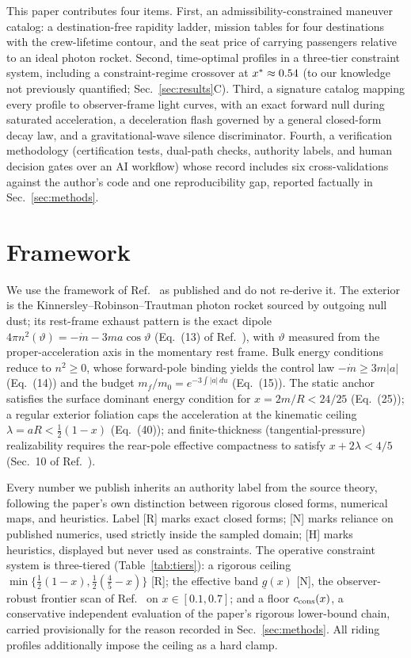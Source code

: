 \documentclass[11pt]{article}
\begin{document}
This paper contributes four items. First, an admissibility-constrained
maneuver catalog: a destination-free rapidity ladder, mission tables for
four destinations with the crew-lifetime contour, and the seat price of
carrying passengers relative to an ideal photon rocket. Second,
time-optimal profiles in a three-tier constraint system, including a
constraint-regime crossover at $x^* \approx 0.54$ (to our knowledge
not previously quantified; Sec.~\ref{sec:results}C). Third, a signature
catalog mapping every
profile to observer-frame light curves, with an exact forward null during
saturated acceleration, a deceleration flash governed by a general
closed-form decay law, and a gravitational-wave silence discriminator.
Fourth, a verification methodology (certification tests, dual-path checks,
authority labels, and human decision gates over an AI workflow) whose
record includes six cross-validations against the author's code and one
reproducibility gap, reported factually in Sec.~\ref{sec:methods}.

\section{Framework}\label{sec:framework}

We use the framework of Ref.~\cite{le-steering} as published and do not
re-derive it. The exterior is the Kinnersley--Robinson--Trautman photon
rocket sourced by outgoing null dust; its rest-frame exhaust pattern is
the exact dipole $4\pi n^2(\vartheta) = -\dot m - 3ma\cos\vartheta$
(Eq.~(13) of Ref.~\cite{le-steering}), with $\vartheta$ measured from the
proper-acceleration axis in the momentary rest frame. Bulk energy
conditions reduce to $n^2 \geq 0$, whose forward-pole binding yields the
control law $-\dot m \geq 3m|a|$ (Eq.~(14)) and the budget $m_f/m_0 =
e^{-3\int|a|\,du}$ (Eq.~(15)). The static anchor satisfies the surface
dominant energy condition for $x = 2m/R < 24/25$ (Eq.~(25)); a regular
exterior foliation caps the acceleration at the kinematic ceiling
$\lambda = aR < \tfrac{1}{2}(1-x)$ (Eq.~(40)); and finite-thickness
(tangential-pressure) realizability requires the rear-pole effective
compactness to satisfy $x + 2\lambda < 4/5$ (Sec.~10 of
Ref.~\cite{le-steering}).

Every number we publish inherits an authority label from the source
theory, following the paper's own distinction between rigorous closed
forms, numerical maps, and heuristics. Label [R] marks exact closed forms;
[N] marks reliance on published numerics, used strictly inside the sampled
domain; [H] marks heuristics, displayed but never used as constraints. The
operative constraint system is three-tiered (Table~\ref{tab:tiers}): a
rigorous ceiling $\min\{\tfrac12(1-x), \tfrac12(\tfrac45 - x)\}$ [R]; the
effective band $\underline{g}(x)$ [N], the observer-robust frontier scan
of Ref.~\cite{le-steering} on $x \in [0.1, 0.7]$; and a floor $c_{\rm
cons}(x)$, a conservative independent evaluation of the paper's rigorous
lower-bound chain, carried provisionally for the reason recorded in
Sec.~\ref{sec:methods}. All riding profiles additionally impose the
ceiling as a hard clamp.
\end{document}
